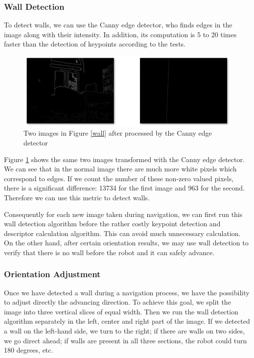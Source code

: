 \documentclass[a4paper]{scrartcl}
\begin{document}
\subsubsection{Wall Detection}
To detect walls, we can use the Canny edge detector, who finds edges in the image along with their intensity. In addition, its computation is 5 to 20 times faster than the detection of keypoints according to the tests. 

\begin{figure}[h]
\centering
  \includegraphics[width=0.8\linewidth]{img/wall_canny.png}
  \caption{Two images in Figure \ref{wall} after processed by the Canny edge detector}
\label{wall_canny}
\end{figure}

Figure \ref{wall_canny} shows the same two images transformed with the Canny edge detector. We can see that in the normal image there are much more white pixels which correspond to edges. If we count the number of these non-zero valued pixels, there is a significant difference: 13734 for the first image and 963 for the second. Therefore we can use this metric to detect walls.

Consequently for each new image taken during navigation, we can first run this wall detection algorithm before the rather costly keypoint detection and descriptor calculation algorithm. This can avoid much unnecessary calculation. On the other hand, after certain orientation results, we may use wall detection to verify that there is no wall before the robot and it can safely advance. 

\subsubsection{Orientation Adjustment}
Once we have detected a wall during a navigation process, we have the possibility to adjust directly the advancing direction. To achieve this goal, we split the image into three vertical slices of equal width. Then we run the wall detection algorithm separately in the left, center and right part of the image. If we detected a wall on the left-hand side, we turn to the right; if there are walls on two sides, we go direct ahead; if walls are present in all three sections, the robot could turn 180 degrees, etc.
\end{document}
